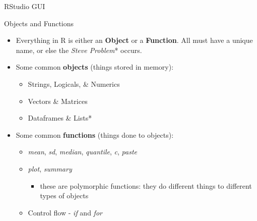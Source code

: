 \documentclass[
  ignorenonframetext,
  aspectratio=169]{beamer}
\providecommand{\tightlist}{%
  \setlength{\itemsep}{0pt}\setlength{\parskip}{0pt}}
\begin{document}
\begin{frame}{RStudio GUI}
\protect\hypertarget{rstudio-gui}{}
\end{frame}

\begin{frame}{Objects and Functions}
\protect\hypertarget{objects-and-functions}{}
\begin{itemize}[<+->]
\tightlist
\item
  Everything in R is either an \textbf{Object} or a \textbf{Function}.
  All must have a unique name, or else the \emph{Steve Problem}* occurs.
\item
  Some common \textbf{objects} (things stored in memory):

  \begin{itemize}[<+->]
  \tightlist
  \item
    Strings, Logicals, \& Numerics
  \item
    Vectors \& Matrices
  \item
    Dataframes \& Lists*
  \end{itemize}
\item
  Some common \textbf{functions} (things done to objects):

  \begin{itemize}[<+->]
  \tightlist
  \item
    \emph{mean}, \emph{sd}, \emph{median}, \emph{quantile}, \emph{c},
    \emph{paste}
  \item
    \emph{plot}, \emph{summary}

    \begin{itemize}[<+->]
    \tightlist
    \item
      these are polymorphic functions: they do different things to
      different types of objects
    \end{itemize}
  \item
    Control flow - \emph{if} and \emph{for}
  \end{itemize}
\end{itemize}
\end{frame}
\end{document}
